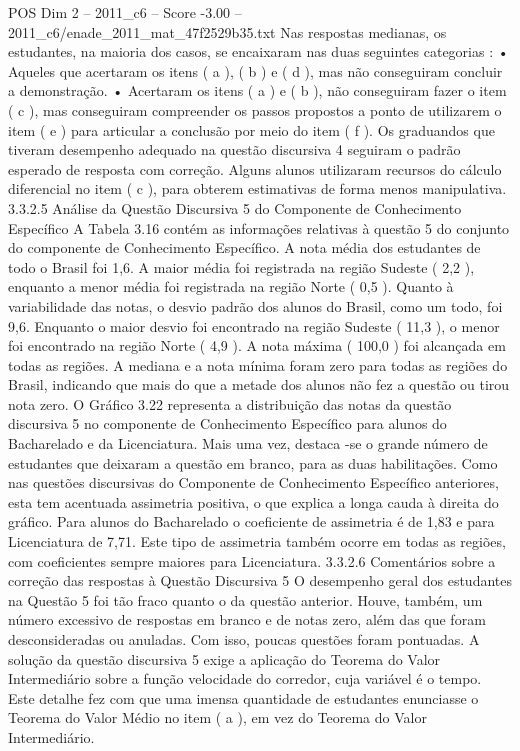 \begin{textsample}{POS Dim 2 – 2011\_c6 – Score -3.00 – 2011\_c6/enade\_2011\_mat\_47f2529b35.txt}
Nas respostas medianas, os estudantes, na maioria dos casos, se encaixaram nas duas seguintes categorias : • Aqueles que acertaram os itens ( a ), ( b ) e ( d ), mas não conseguiram concluir a demonstração. • Acertaram os itens ( a ) e ( b ), não conseguiram fazer o item ( c ), mas conseguiram compreender os passos propostos a ponto de utilizarem o item ( e ) para articular a conclusão por meio do item ( f ).
Os graduandos que tiveram desempenho adequado na questão discursiva 4 seguiram o padrão esperado de resposta com correção.
Alguns alunos utilizaram recursos do cálculo diferencial no item ( c ), para obterem estimativas de forma menos manipulativa. 3.3.2.5 Análise da Questão Discursiva 5 do Componente de Conhecimento Específico A Tabela 3.16 contém as informações relativas à questão 5 do conjunto do componente de Conhecimento Específico.
A nota média dos estudantes de todo o Brasil foi 1,6.
A maior média foi registrada na região Sudeste ( 2,2 ), enquanto a menor média foi registrada na região Norte ( 0,5 ).
Quanto à variabilidade das notas, o desvio padrão dos alunos do Brasil, como um todo, foi 9,6.
Enquanto o maior desvio foi encontrado na região Sudeste ( 11,3 ), o menor foi encontrado na região Norte ( 4,9 ).
A nota máxima ( 100,0 ) foi alcançada em todas as regiões.
A mediana e a nota mínima foram zero para todas as regiões do Brasil, indicando que mais do que a metade dos alunos não fez a questão ou tirou nota zero.
O Gráfico 3.22 representa a distribuição das notas da questão discursiva 5 no componente de Conhecimento Específico para alunos do Bacharelado e da Licenciatura.
Mais uma vez, destaca -se o grande número de estudantes que deixaram a questão em branco, para as duas habilitações.
Como nas questões discursivas do Componente de Conhecimento Específico anteriores, esta tem acentuada assimetria positiva, o que explica a longa cauda à direita do gráfico.
Para alunos do Bacharelado o coeficiente de assimetria é de 1,83 e para Licenciatura de 7,71.
Este tipo de assimetria também ocorre em todas as regiões, com coeficientes sempre maiores para Licenciatura. 3.3.2.6 Comentários sobre a correção das respostas à Questão Discursiva 5 O desempenho geral dos estudantes na Questão 5 foi tão fraco quanto o da questão anterior.
Houve, também, um número excessivo de respostas em branco e de notas zero, além das que foram desconsideradas ou anuladas.
Com isso, poucas questões foram pontuadas.
A solução da questão discursiva 5 exige a aplicação do Teorema do Valor Intermediário sobre a função velocidade do corredor, cuja variável é o tempo.
Este detalhe fez com que uma imensa quantidade de estudantes enunciasse o Teorema do Valor Médio no item ( a ), em vez do Teorema do Valor Intermediário.

\end{textsample}
